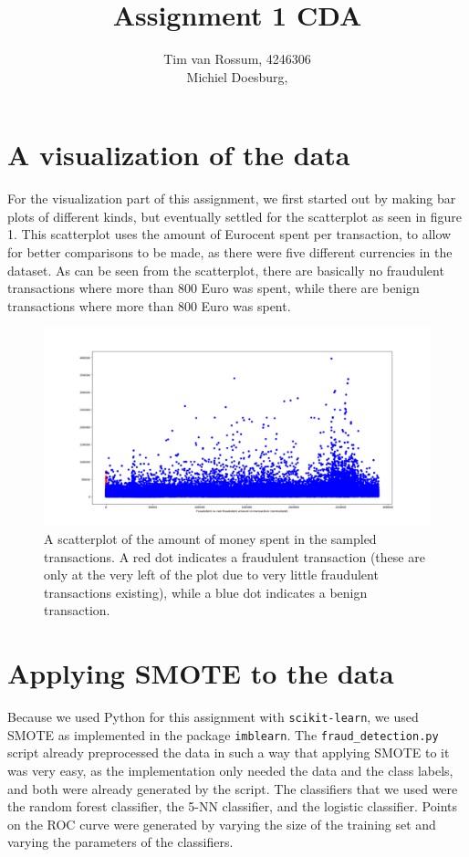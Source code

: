 \documentclass[]{article}
\title{Assignment 1 CDA}
\author{Tim van Rossum, 4246306\\
	Michiel Doesburg,}
\begin{document}
\maketitle

\section{A visualization of the data}
For the visualization part of this assignment, we first started out by making bar plots of different kinds, but eventually settled  for the scatterplot as seen in figure 1. This scatterplot uses the amount of Eurocent spent per transaction, to allow for better comparisons to be made, as there were five different currencies in the dataset. As can be seen from the scatterplot, there are basically no fraudulent transactions where more than 800 Euro was spent, while there are benign transactions where more than 800 Euro was spent.
\begin{figure}[h!]
	\centering
	\includegraphics[scale = 0.25]{Visualizations/fraud_vs_nonfraud_better}
	\caption{A scatterplot of the amount of money spent in the sampled transactions. A red dot indicates a fraudulent transaction (these are only at the very left of the plot due to very little fraudulent transactions existing), while a blue dot indicates a benign transaction.}
\end{figure}
\clearpage
\section{Applying SMOTE to the data}
Because we used Python for this assignment with \texttt{scikit-learn}, we used SMOTE as implemented in the package \texttt{imblearn}. The \texttt{fraud\_detection.py} script already preprocessed the data in such a way that applying SMOTE to it was very easy, as the implementation only needed the data and the class labels, and both were already generated by the script. The classifiers that we used were the random forest classifier, the 5-NN classifier, and the logistic classifier. Points on the ROC curve were generated by varying the size of the training set and varying the parameters of the classifiers.
\end{document}
